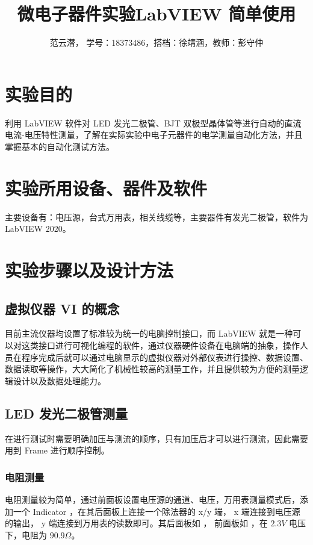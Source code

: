 \documentclass[lang=cn,11pt,a4paper,cite=authoryear]{elegantpaper}
\title{微电子器件实验\quad LabVIEW 简单使用}
\author{范云潜， 学号：18373486，搭档：徐靖涵，教师：彭守仲}
\institute{微电子学院 184111 班}
\date{\zhtoday}
\begin{document}
\maketitle


\section{实验目的}

利用 LabVIEW 软件对 LED 发光二极管、BJT 双极型晶体管等进行自动的直流电流-电压特性测量，了解在实际实验中电子元器件的电学测量自动化方法，并且掌握基本的自动化测试方法。

\section{实验所用设备、器件及软件}


主要设备有：电压源，台式万用表，相关线缆等，主要器件有发光二极管，软件为 LabVIEW 2020。

\section{实验步骤以及设计方法}

\subsection{虚拟仪器 VI 的概念}

目前主流仪器均设置了标准较为统一的电脑控制接口，而 LabVIEW 就是一种可以对这类接口进行可视化编程的软件，通过仪器硬件设备在电脑端的抽象，操作人员在程序完成后就可以通过电脑显示的虚拟仪器对外部仪表进行操控、数据设置、数据读取等操作，大大简化了机械性较高的测量工作，并且提供较为方便的测量逻辑设计以及数据处理能力。

\subsection{LED 发光二极管测量}

在进行测试时需要明确加压与测流的顺序，只有加压后才可以进行测流，因此需要用到 Frame 进行顺序控制。 

\subsubsection{电阻测量}

电阻测量较为简单，通过前面板设置电压源的通道、电压，万用表测量模式后，添加一个 Indicator ，在其后面板上连接一个除法器的 x/y 端， x 端连接到电压源的输出， y 端连接到万用表的读数即可。其后面板如  ， 前面板如  ，在 \(2.3 V\) 电压下，电阻为 \(90.9 \Omega\)。
\end{document}
